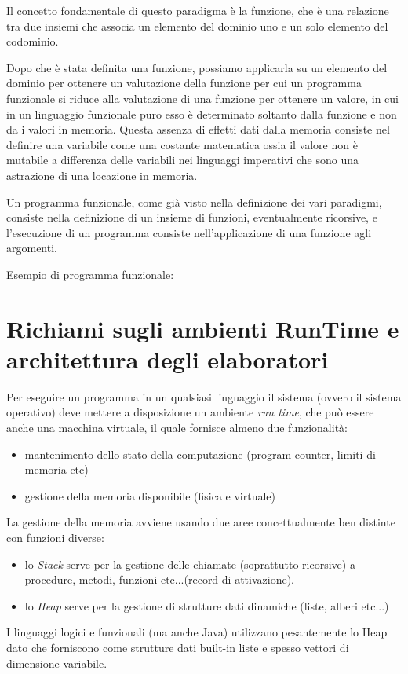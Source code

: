 \documentclass[a4paper]{report}
\begin{document}
Il concetto fondamentale di questo paradigma è la funzione, che è una relazione tra due insiemi che associa un elemento del dominio uno e
un solo elemento del codominio.

Dopo che è stata definita una funzione, possiamo applicarla su un elemento del dominio per ottenere un valutazione della funzione per cui
un programma funzionale si riduce alla valutazione di una funzione per ottenere un valore, in cui in un linguaggio funzionale puro esso è
determinato soltanto dalla funzione e non da i valori in memoria.\newline
Questa assenza di effetti dati dalla memoria consiste nel definire una variabile come una costante matematica ossia il valore non è mutabile
a differenza delle variabili nei linguaggi imperativi che sono una astrazione di una locazione in memoria.

Un programma funzionale, come già visto nella definizione dei vari paradigmi, consiste nella definizione di un insieme di funzioni,
eventualmente ricorsive, e l'esecuzione di un programma consiste nell'applicazione di una funzione agli argomenti.

Esempio di programma funzionale:

\section{Richiami sugli ambienti RunTime e architettura degli elaboratori}
Per eseguire un programma in un qualsiasi linguaggio il sistema (ovvero il sistema operativo) deve mettere a disposizione
un ambiente \textit{run time}, che può essere anche una macchina virtuale, il quale fornisce almeno due funzionalità:
\begin{itemize}
\item mantenimento dello stato della computazione (program counter, limiti di memoria etc)
\item gestione della memoria disponibile (fisica e virtuale)
\end{itemize}

La gestione della memoria avviene usando due aree concettualmente ben distinte con funzioni diverse:
\begin{itemize}
\item lo \textit{Stack}  serve per la gestione delle chiamate (soprattutto ricorsive) a procedure, metodi, funzioni etc...(record di attivazione).
\item lo \textit{Heap} serve per la gestione di strutture dati dinamiche (liste, alberi etc...)
\end{itemize}
I linguaggi logici e funzionali (ma anche Java) utilizzano pesantemente lo Heap dato che forniscono come strutture dati built-in 
liste e spesso vettori di dimensione variabile.
\end{document}
